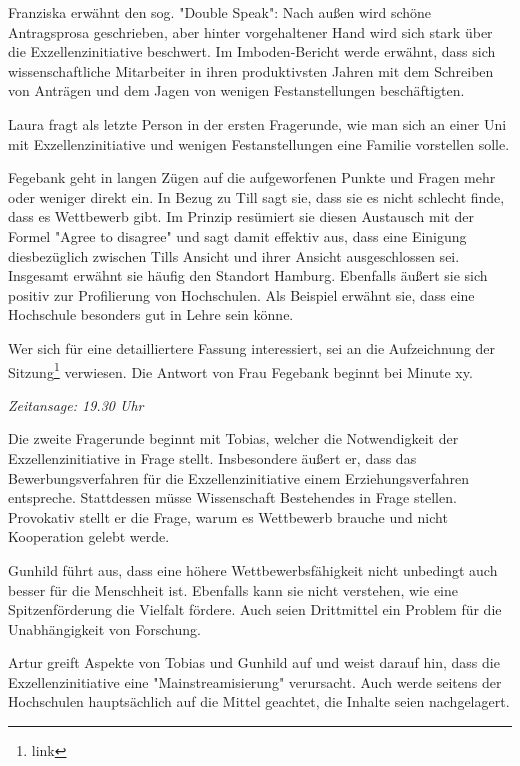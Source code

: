 \documentclass[ngerman,headheight=70pt]{scrartcl}
\begin{document}
    Franziska erwähnt den sog. "Double Speak": Nach außen wird schöne Antragsprosa
    geschrieben, aber hinter vorgehaltener Hand wird sich stark über die
    Exzellenzinitiative beschwert. Im Imboden-Bericht werde erwähnt, dass
    sich wissenschaftliche Mitarbeiter in ihren produktivsten Jahren mit
    dem Schreiben von Anträgen und dem Jagen von wenigen Festanstellungen
    beschäftigten.

    Laura fragt als letzte Person in der ersten Fragerunde, wie man sich an einer
    Uni mit Exzellenzinitiative und wenigen Festanstellungen eine Familie vorstellen
    solle.

    Fegebank geht in langen Zügen auf die aufgeworfenen Punkte und Fragen
    mehr oder weniger direkt ein. In Bezug zu Till sagt sie, dass sie es nicht
    schlecht finde, dass es Wettbewerb gibt. Im Prinzip resümiert sie diesen
    Austausch mit der Formel "Agree to disagree" und sagt damit effektiv aus,
    dass eine Einigung diesbezüglich zwischen Tills Ansicht und ihrer Ansicht
    ausgeschlossen sei. Insgesamt erwähnt sie häufig den Standort Hamburg.
    Ebenfalls äußert sie sich positiv zur Profilierung von Hochschulen. Als Beispiel
    erwähnt sie, dass eine Hochschule besonders gut in Lehre sein könne.

    Wer sich für eine detailliertere Fassung interessiert, sei an die Aufzeichnung
    der Sitzung\footnote{link} verwiesen. Die Antwort von Frau Fegebank beginnt
    bei Minute xy.

    \textit{Zeitansage: 19.30 Uhr}

    Die zweite Fragerunde beginnt mit Tobias, welcher die Notwendigkeit der
    Exzellenzinitiative in Frage stellt. Insbesondere äußert er, dass das
    Bewerbungsverfahren für die Exzellenzinitiative einem Erziehungsverfahren
    entspreche. Stattdessen müsse Wissenschaft Bestehendes in Frage stellen.
    Provokativ stellt er die Frage, warum es Wettbewerb brauche und nicht
    Kooperation gelebt werde.

    Gunhild führt aus, dass eine höhere Wettbewerbsfähigkeit nicht unbedingt
    auch besser für die Menschheit ist. Ebenfalls kann sie nicht verstehen,
    wie eine Spitzenförderung die Vielfalt fördere. Auch seien Drittmittel ein
    Problem für die Unabhängigkeit von Forschung.

    Artur greift Aspekte von Tobias und Gunhild auf und weist darauf hin, dass
    die Exzellenzinitiative eine "Mainstreamisierung" verursacht. Auch werde
    seitens der Hochschulen hauptsächlich auf die Mittel geachtet, die Inhalte
    seien nachgelagert.
\end{document}
